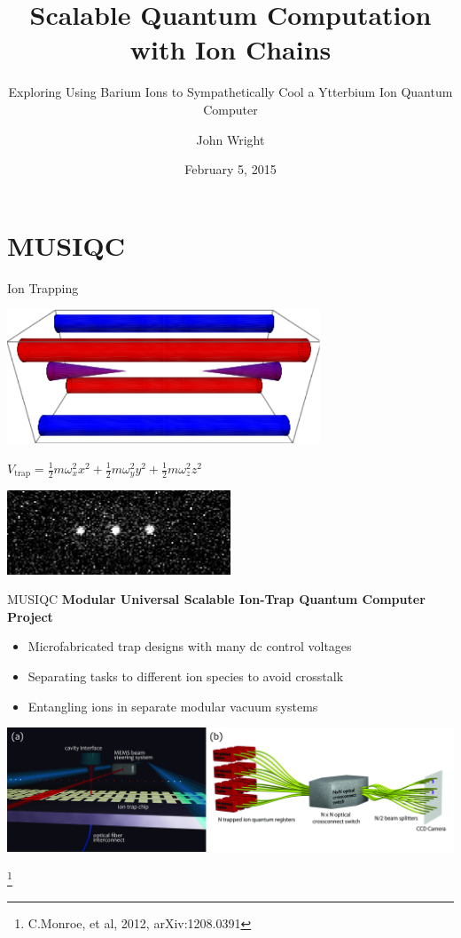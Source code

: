 \documentclass{beamer}
\title[Ba-Yb Quantum Computing]{Scalable Quantum Computation with Ion Chains}
\subtitle{Exploring Using Barium Ions to Sympathetically Cool a Ytterbium Ion Quantum Computer}
\author[J. Wright]{John Wright}
\institute[UW] {
	Department of Physics \\
	University of Washington
}
\date[February 2015]{February 5, 2015}
\begin{document}
\begin{frame}[plain]
\titlepage
\end{frame}

\section{MUSIQC}
\begin{frame}{Ion Trapping}
	\centerline{\includegraphics[width=0.7\textwidth]{PaulTrap}}
	\centerline{$V_\mathrm{trap} = \frac{1}{2} m \omega_x^2 x^2 + \frac{1}{2} m \omega_y^2 y^2 + \frac{1}{2} m \omega_z^2 z^2$}
	\vfill
	\centerline{\includegraphics[width=0.5\textwidth]{ThreeIons}}
\end{frame}

\begin{frame}{MUSIQC}
\textbf{Modular Universal Scalable Ion-Trap Quantum Computer Project}
\begin{itemize}
	\item Microfabricated trap designs with many dc control voltages
	\item Separating tasks to different ion species to avoid crosstalk
	\item Entangling ions in separate modular vacuum systems
\end{itemize}
\vfill
\centerline{\includegraphics[height=0.38\textheight]{MUSIQC-plan}}
\let\thefootnote\relax\footnote[frame]{C.Monroe, et al, 2012, arXiv:1208.0391}
\end{frame}
\end{document}
